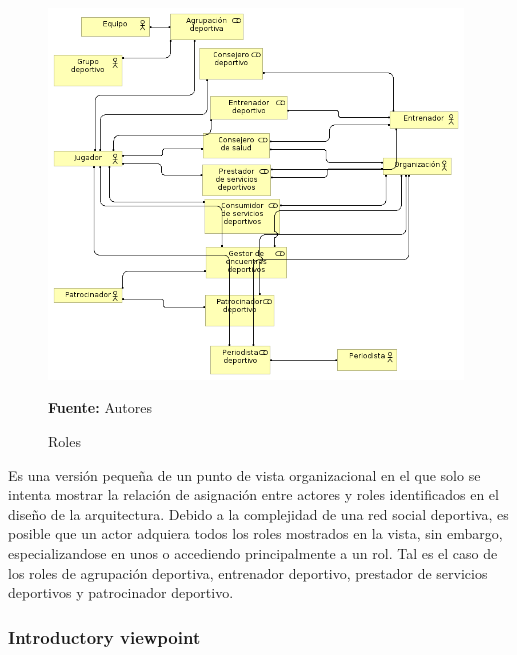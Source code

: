 \begin{figure}[!htb]
  \begin{center}
    \includegraphics[width=11cm]{./imagenes/roles.png}
    \caption{Roles}
    \label{fig:Roles}
    \textbf{Fuente:}  Autores
  \end{center}
\end{figure}

Es una versión pequeña de un punto de vista organizacional en el que solo se intenta mostrar la relación de asignación entre actores y roles identificados en el diseño de la arquitectura. Debido a la complejidad de una red social deportiva, es posible que un actor adquiera todos los roles mostrados en la vista, sin embargo, especializandose en unos o accediendo principalmente a un rol. Tal es el caso de los roles de agrupación deportiva, entrenador deportivo, prestador de servicios deportivos y patrocinador deportivo.

\subsubsection{Introductory viewpoint}

